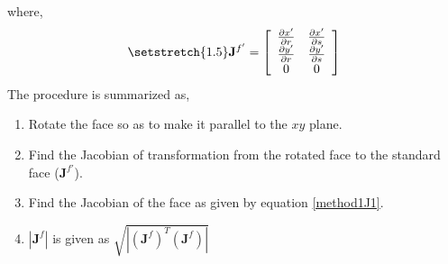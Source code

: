 where,
\begin{equation}\label{method1J'}
        {\setstretch{1.5}
		\mathbf{J}^{f'} = 
        \left[\begin{array}{c c}
       		 \frac{\partial x'}{\partial r}  & \frac{\partial x'}{\partial s}  \\
       		 \frac{\partial y'}{\partial r}  & \frac{\partial y'}{\partial s}  \\
				0		 &             0		   \\
        \end{array} \right]
}
\end{equation}
The procedure is summarized as,
\begin{enumerate}
        \item Rotate the face so as to make it parallel to the $xy$ plane.
	\item Find the Jacobian of transformation from the rotated face to the standard face ($\mathbf{J}^{f'}$).
	\item Find the Jacobian of the face as given by equation \ref{method1J1}.
	\item $|\mathbf{J}^{f}|$ is given as $\sqrt{|\left(\mathbf{J}^{f}\right)^{T}\left(\mathbf{J}^{f}\right)|}$
\end{enumerate}

